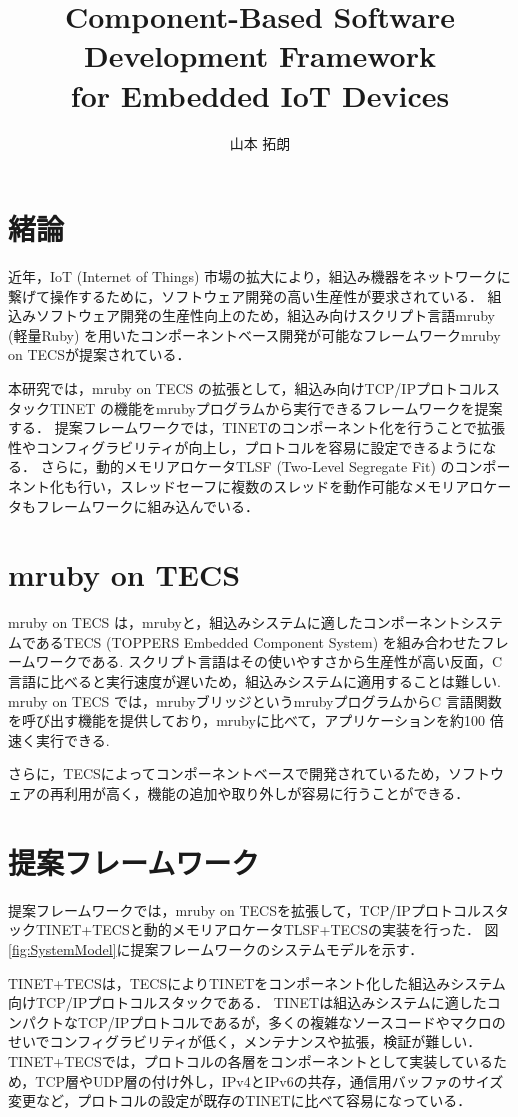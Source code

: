 \documentclass[a4j,10pt,twocolumn]{../styles/utf8/abstract}
\title{Component-Based Software Development Framework\\for Embedded IoT Devices}	%
\author{山本 拓朗} 		%
\begin{document}
\absttitle 		%

\section{緒論}

近年，IoT (Internet of Things) 市場の拡大により，組込み機器をネットワークに繋げて操作するために，ソフトウェア開発の高い生産性が要求されている．
組込みソフトウェア開発の生産性向上のため，組込み向けスクリプト言語mruby (軽量Ruby) を用いたコンポーネントベース開発が可能なフレームワークmruby on TECS\cite{par:mrubyonTECS}が提案されている．

本研究では，mruby on TECS の拡張として，組込み向けTCP/IPプロトコルスタックTINET の機能をmrubyプログラムから実行できるフレームワークを提案する．
提案フレームワークでは，TINETのコンポーネント化を行うことで拡張性やコンフィグラビリティが向上し，プロトコルを容易に設定できるようになる．
さらに，動的メモリアロケータTLSF (Two-Level Segregate Fit) のコンポーネント化も行い，スレッドセーフに複数のスレッドを動作可能なメモリアロケータもフレームワークに組み込んでいる．

\section{mruby on TECS}

mruby on TECS は，mrubyと，組込みシステムに適したコンポーネントシステムであるTECS (TOPPERS Embedded Component System) を組み合わせたフレームワークである.
スクリプト言語はその使いやすさから生産性が高い反面，C 言語に比べると実行速度が遅いため，組込みシステムに適用することは難しい.
mruby on TECS では，mrubyブリッジというmrubyプログラムからC 言語関数を呼び出す機能を提供しており，mrubyに比べて，アプリケーションを約100 倍速く実行できる.

さらに，TECSによってコンポーネントベースで開発されているため，ソフトウェアの再利用が高く，機能の追加や取り外しが容易に行うことができる．

\section{提案フレームワーク}

提案フレームワークでは，mruby on TECSを拡張して，TCP/IPプロトコルスタックTINET+TECSと動的メモリアロケータTLSF+TECSの実装を行った．
図\ref{fig:SystemModel}に提案フレームワークのシステムモデルを示す．

TINET+TECSは，TECSによりTINETをコンポーネント化した組込みシステム向けTCP/IPプロトコルスタックである．
TINETは組込みシステムに適したコンパクトなTCP/IPプロトコルであるが，多くの複雑なソースコードやマクロのせいでコンフィグラビリティが低く，メンテナンスや拡張，検証が難しい．
TINET+TECSでは，プロトコルの各層をコンポーネントとして実装しているため，TCP層やUDP層の付け外し，IPv4とIPv6の共存，通信用バッファのサイズ変更など，プロトコルの設定が既存のTINETに比べて容易になっている．
\end{document}
